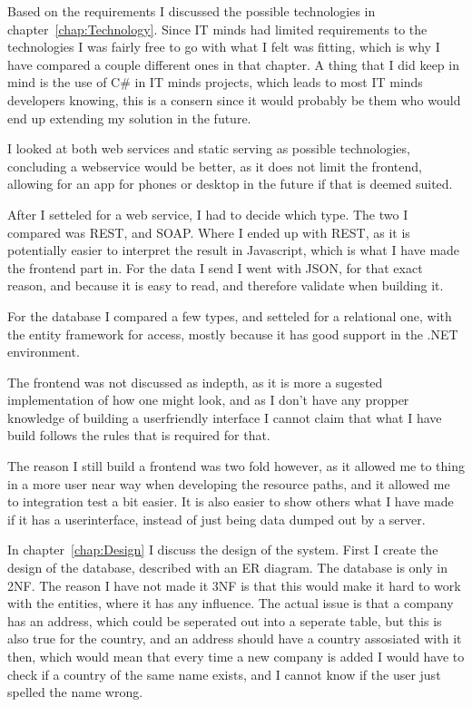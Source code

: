 Based on the requirements I discussed the possible technologies in
chapter~\ref{chap:Technology}. Since IT minds had limited requirements to the
technologies I was fairly free to go with what I felt was fitting, which is why
I have compared a couple different ones in that chapter. A thing that I did keep
in mind is the use of C\# in IT minds projects, which leads to most IT minds
developers knowing, this is a consern since it would probably be them who would
end up extending my solution in the future.

I looked at both web services and static serving as possible technologies,
concluding a webservice would be better, as it does not limit the frontend,
allowing for an app for phones or desktop in the future if that is deemed suited.

After I setteled for a web service, I had to decide which type. The two I
compared was REST, and SOAP. Where I ended up with REST, as it is potentially
easier to interpret the result in Javascript, which is what I have made the
frontend part in. For the data I send  I went with JSON, for that exact reason,
and because it is easy to read, and therefore validate when building it.

For the database I compared a few types, and setteled for a relational one, with
the entity framework for access, mostly because it has good support in the .NET
environment.

The frontend was not discussed as indepth, as it is more a sugested
implementation of how one might look, and as I don't have any propper knowledge
of building a userfriendly interface I cannot claim that what I have build
follows the rules that is required for that. 

The reason I still build a frontend was two fold however, as it allowed me to
thing in a more user near way when developing the resource paths, and it allowed
me to integration test a bit easier. It is also easier to show others what I
have made if it has a userinterface, instead of just being data dumped out by a server.

In chapter~\ref{chap:Design} I discuss the design of the system. First I create
the design of the database, described with an ER diagram. The database is only
in 2NF. The reason I have not made it 3NF is that this would make it hard to
work with the entities, where it has any influence. The actual issue is that a
company has an address, which could be seperated out into a seperate table, but
this is also true for the country, and an address should have a country
assosiated with it then, which would mean that every time a new company is added
I would have to check if a country of the same name exists, and I cannot know if
the user just spelled the name wrong.

